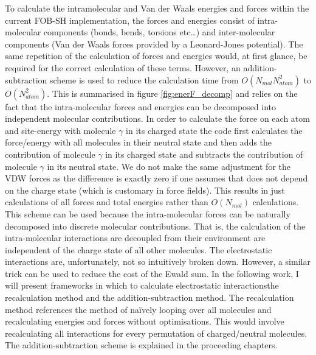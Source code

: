 To calculate the intramolecular and Van der Waals energies and forces within the current FOB-SH implementation, the forces and energies consist of intra-molecular components (bonds, bends, torsions etc\ldots) and inter-molecular components (Van der Waals forces provided by a Leonard-Jones potential). The same repetition of the calculation of forces and energies would, at first glance, be required for the correct calculation of these terms. However, an addition-subtraction scheme is used to reduce the calculation time from $O(N_{mol} N_{atom}^2)$ to $O(N_{atom}^2)$. This is summarised in figure \ref{fig:enerF_decomp} and relies on the fact that the intra-molecular forces and energies can be decomposed into independent molecular contributions. In order to calculate the force on each atom and site-energy with molecule $\gamma$ in its charged state the code first calculates the force/energy with all molecules in their neutral state and then adds the contribution of molecule $\gamma$ in its charged state and subtracts the contribution of molecule $\gamma$ in its neutral state. We do not make the same adjustment for the VDW forces as the difference is exactly zero if one assumes that  does not depend on the charge state (which is customary in force fields). This results in just  calculations of all forces and total energies rather than $O(N_{mol})$ calculations. This scheme can be used because the intra-molecular forces can be naturally decomposed into discrete molecular contributions. That is, the calculation of the intra-molecular interactions are decoupled from their environment are independent of the charge state of all other molecules. The electrostatic interactions are, unfortunately, not so intuitively broken down. However, a similar trick can be used to reduce the cost of the Ewald sum. In the following work, I will present  frameworks in which to calculate electrostatic interactions\replace{ -}{: }the recalculation method and the addition-subtraction method. The recalculation method references the method of na\"ively looping over all molecules and recalculating energies and forces without optimisations. This would involve recalculating all interactions for every permutation of charged/neutral molecules. The addition-subtraction scheme is explained in the proceeding chapters.
